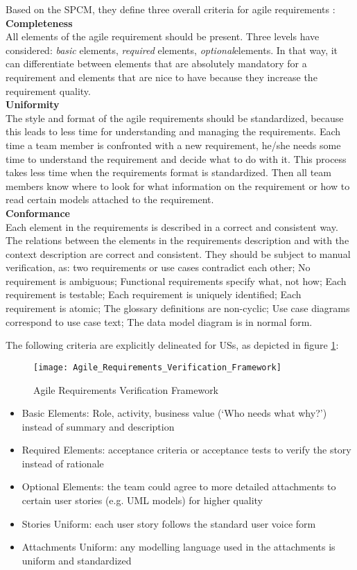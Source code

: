 Based on the SPCM, they define three overall criteria for agile requirements \cite{heck2014quality}: 
\textbf{Completeness}\\ 
All elements of the agile requirement should be present. Three levels have considered: \emph{basic} elements, \emph{required} elements, \emph{optional}elements. In that way, it can differentiate between elements that are absolutely mandatory for a requirement and elements that are nice to have because they increase the requirement quality. \\ 
\textbf{Uniformity}\\ 
The style and format of the agile requirements should be standardized, because this leads to less time for understanding and managing the requirements. Each time a team member is confronted with a new requirement, he/she needs some time to understand the requirement and decide what to do with it. This process takes less time when the requirements format is standardized. Then all team members know where to look for what information on the requirement or how to read certain models attached to the requirement. \\ 
\textbf{Conformance}\\ 
Each element in the requirements is described in a correct and consistent way. The relations between the elements in the requirements description and with the context description are correct and consistent. They should be subject to manual verification, as: two requirements or use cases contradict each other; No requirement is ambiguous; Functional requirements specify what, not how; Each requirement is testable; Each requirement is uniquely identified; Each requirement is atomic; The glossary definitions are non-cyclic; Use case diagrams correspond to use case text; The data model diagram is in normal form.

The following criteria are explicitly delineated for USs, as depicted in figure \ref{fig:arvf}:
\begin{figure}
\center
\texttt{[image: Agile\_Requirements\_Verification\_Framework]}
\caption{Agile Requirements Verification Framework \cite{heck2014quality}}\label{fig:arvf}
\end{figure}


\begin{itemize}
\item Basic Elements: Role, activity, business value (‘Who needs what why?’) instead of summary and description
\item Required Elements: acceptance criteria or acceptance tests to verify the story instead of rationale
\item Optional Elements: the team could agree to more detailed attachments to certain user stories (e.g. UML models) for higher quality
\item Stories Uniform: each user story follows the standard user voice form
\item Attachments Uniform: any modelling language used in the attachments is uniform and standardized
\end{itemize}


